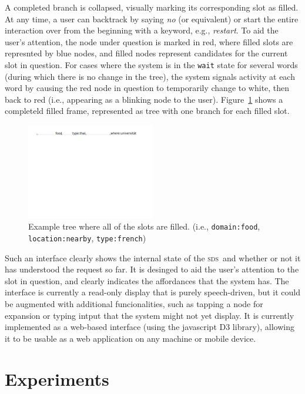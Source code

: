 \documentclass[11pt]{article}
\newcommand{\sds}[0]{\textsc{sds}}
\begin{document}
A completed branch is collapsed, visually marking its corresponding slot as filled. At any time, a user can backtrack by saying \emph{no} (or equivalent) or start the entire interaction over from the beginning with a keyword, e.g., \emph{restart}. To aid the user's attention, the node under question is marked in red, where filled slots are represnted by blue nodes, and filled nodes represent candidates for the current slot in question. For cases where the system is in the \texttt{wait} state for several words (during which there is no change in the tree), the system signals activity at each word by causing the red node in question to temporarily change to white, then back to red (i.e., appearing as a blinking node to the user). Figure~\ref{fig:filled} shows a completeld filled frame, represented as tree with one branch for each filled slot.

\begin{figure}[ht]
  \centering
      \includegraphics[width=0.5\textwidth]{figures/diatree-filled.pdf}	
      \caption{Example tree where all of the slots are filled. (i.e., \texttt{domain:food}, \texttt{location:nearby}, \texttt{type:french}) \label{fig:filled}}
\end{figure}

Such an interface clearly shows the internal state of the \sds\ and whether or not it has understood the request so far. It is desinged to aid the user's attention to the slot in question, and clearly indicates the affordances that the system has. The interface is currently a read-only display that is purely speech-driven, but it could be augmented with additional funcionalities, such as tapping a node for expansion or typing intput that the system might not yet display. It is currently implemented as a web-based interface (using the javascript D3 library), allowing it to be usable as a web application on any machine or mobile device. 


\section{Experiments}
\label{section:experiments}
\end{document}
